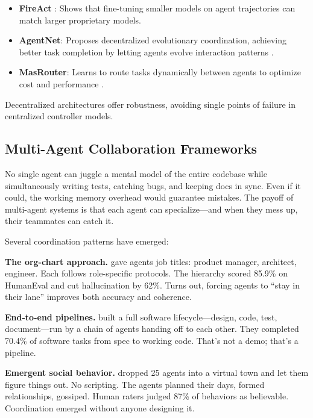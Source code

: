 \documentclass[12pt,a4paper]{report}
\theoremstyle{definition}
\begin{document}
\begin{itemize}
    \item \textbf{FireAct} \cite{chen2023fireact}: Shows that fine-tuning smaller models on agent trajectories can match larger proprietary models.
    \item \textbf{AgentNet}: Proposes decentralized evolutionary coordination, achieving better task completion by letting agents evolve interaction patterns \cite{zhang2024agentnet}.
    \item \textbf{MasRouter}: Learns to route tasks dynamically between agents to optimize cost and performance \cite{chen2024masrouter}.
\end{itemize}
Decentralized architectures offer robustness, avoiding single points of failure in centralized controller models.

\subsection{Multi-Agent Collaboration Frameworks}
\label{sec:multi_agent_collab}

No single agent can juggle a mental model of the entire codebase while simultaneously writing tests, catching bugs, and keeping docs in sync. Even if it could, the working memory overhead would guarantee mistakes. The payoff of multi-agent systems is that each agent can specialize---and when they mess up, their teammates can catch it.

Several coordination patterns have emerged:

\textbf{The org-chart approach.} \citet{hong2023metagpt} gave agents job titles: product manager, architect, engineer. Each follows role-specific protocols. The hierarchy scored 85.9\% on HumanEval and cut hallucination by 62\%. Turns out, forcing agents to ``stay in their lane'' improves both accuracy and coherence.

\textbf{End-to-end pipelines.} \citet{qian2023chatdev} built a full software lifecycle---design, code, test, document---run by a chain of agents handing off to each other. They completed 70.4\% of software tasks from spec to working code. That's not a demo; that's a pipeline.

\textbf{Emergent social behavior.} \citet{park2023generative} dropped 25 agents into a virtual town and let them figure things out. No scripting. The agents planned their days, formed relationships, gossiped. Human raters judged 87\% of behaviors as believable. Coordination emerged without anyone designing it.
\end{document}
